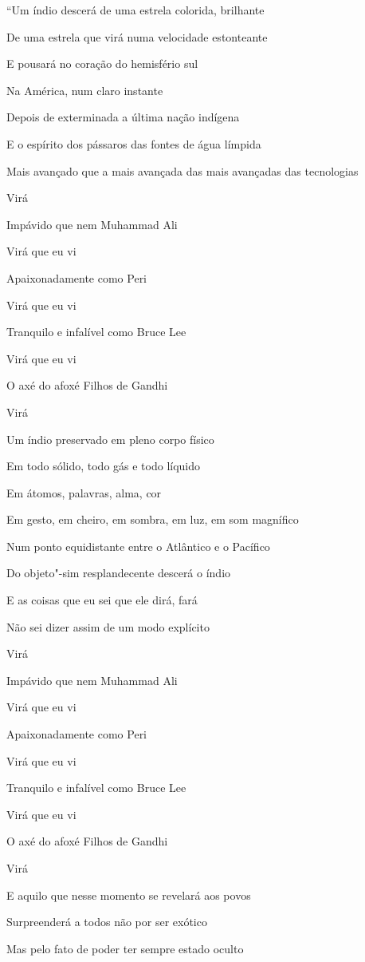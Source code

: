 ``Um índio descerá de uma estrela colorida, brilhante

De uma estrela que virá numa velocidade estonteante

E pousará no coração do hemisfério sul

Na América, num claro instante

Depois de exterminada a última nação indígena

E o espírito dos pássaros das fontes de água límpida

Mais avançado que a mais avançada das mais avançadas das tecnologias

Virá

Impávido que nem Muhammad Ali

Virá que eu vi

Apaixonadamente como Peri

Virá que eu vi

Tranquilo e infalível como Bruce Lee

Virá que eu vi

O axé do afoxé Filhos de Gandhi

Virá

Um índio preservado em pleno corpo físico

Em todo sólido, todo gás e todo líquido

Em átomos, palavras, alma, cor

Em gesto, em cheiro, em sombra, em luz, em som magnífico

Num ponto equidistante entre o Atlântico e o Pacífico

Do objeto"-sim resplandecente descerá o índio

E as coisas que eu sei que ele dirá, fará

Não sei dizer assim de um modo explícito

Virá

Impávido que nem Muhammad Ali

Virá que eu vi

Apaixonadamente como Peri

Virá que eu vi

Tranquilo e infalível como Bruce Lee

Virá que eu vi

O axé do afoxé Filhos de Gandhi

Virá

E aquilo que nesse momento se revelará aos povos

Surpreenderá a todos não por ser exótico

Mas pelo fato de poder ter sempre estado oculto

